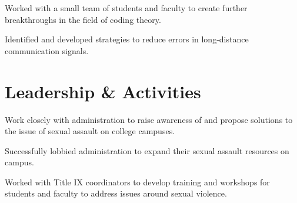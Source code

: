 \documentclass{resume}
\begin{document}
\begin{minipage}[t]{0.66\textwidth}
\begin{tightemize}
\item Worked with a small team of students and faculty to create further breakthroughs in the field of coding theory.
\item Identified and developed strategies to reduce errors in long-distance communication signals.
\end{tightemize}
\sectionsep




\section{Leadership \& Activities}

\begin{tightemize}
\item Work closely with administration to raise awareness of and propose solutions to the issue of sexual assault on college campuses.
\item Successfully lobbied administration to expand their sexual assault resources on campus.
\item Worked with Title IX coordinators to develop training and workshops for students and faculty to address issues around sexual violence.
\end{tightemize}
\sectionsep


\end{minipage}
\end{document}

